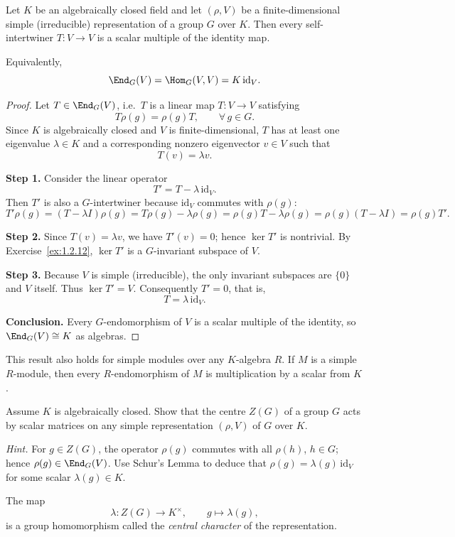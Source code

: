 \begin{theorem}\label{thm:schur-I}
Let $K$ be an algebraically closed field and let $(\rho,V)$ be a finite-dimensional
simple (irreducible) representation of a group $G$ over $K$.
Then every self-intertwiner $T:V\to V$ is a scalar multiple of the identity map.

Equivalently,
\[
\End_G(V) = \Hom_G(V,V) = K\,\mathrm{id}_V.
\]
\end{theorem}

\begin{proof}
Let $T\in\End_G(V)$, i.e.\ $T$ is a linear map $T:V\to V$ satisfying
\[
T\rho(g)=\rho(g)T, \qquad \forall\, g\in G.
\]
Since $K$ is algebraically closed and $V$ is finite-dimensional, $T$ has at least
one eigenvalue $\lambda\in K$ and a corresponding nonzero eigenvector $v\in V$ such that
\[
T(v)=\lambda v.
\]

\smallskip
\noindent\textbf{Step 1.}
Consider the linear operator
\[
T' = T - \lambda\,\mathrm{id}_V.
\]
Then $T'$ is also a $G$-intertwiner because $\mathrm{id}_V$ commutes with $\rho(g)$:
\[
T'\rho(g)
  = (T-\lambda I)\rho(g)
  = T\rho(g)-\lambda\rho(g)
  = \rho(g)T-\lambda\rho(g)
  = \rho(g)(T-\lambda I)
  = \rho(g)T'.
\]

\smallskip
\noindent\textbf{Step 2.}
Since $T(v)=\lambda v$, we have $T'(v)=0$; hence $\ker T'$ is nontrivial.
By Exercise~\ref{ex:1.2.12}, $\ker T'$ is a $G$-invariant subspace of $V$.

\smallskip
\noindent\textbf{Step 3.}
Because $V$ is simple (irreducible), the only invariant subspaces are $\{0\}$ and $V$ itself.
Thus $\ker T' = V$. Consequently $T'=0$, that is,
\[
T = \lambda\,\mathrm{id}_V.
\]

\smallskip
\noindent\textbf{Conclusion.}
Every $G$-endomorphism of $V$ is a scalar multiple of the identity, so
$\End_G(V)\cong K$ as algebras.
\end{proof}

\begin{remark}
This result also holds for simple modules over any $K$-algebra $R$.
If $M$ is a simple $R$-module, then every $R$-endomorphism of $M$
is multiplication by a scalar from $K$.
\end{remark}

\begin{exercise}\label{ex:central-character}
Assume $K$ is algebraically closed.
Show that the centre $Z(G)$ of a group $G$ acts by scalar matrices on any simple representation
$(\rho,V)$ of $G$ over $K$.

\smallskip
\emph{Hint.}
For $g\in Z(G)$, the operator $\rho(g)$ commutes with all $\rho(h)$, $h\in G$;
hence $\rho(g)\in\End_G(V)$.
Use Schur’s Lemma to deduce that $\rho(g)=\lambda(g)\,\mathrm{id}_V$ for some scalar $\lambda(g)\in K$.

The map
\[
\lambda:Z(G)\longrightarrow K^\times,\qquad g\longmapsto \lambda(g),
\]
is a group homomorphism called the \emph{central character} of the representation.
\end{exercise}

